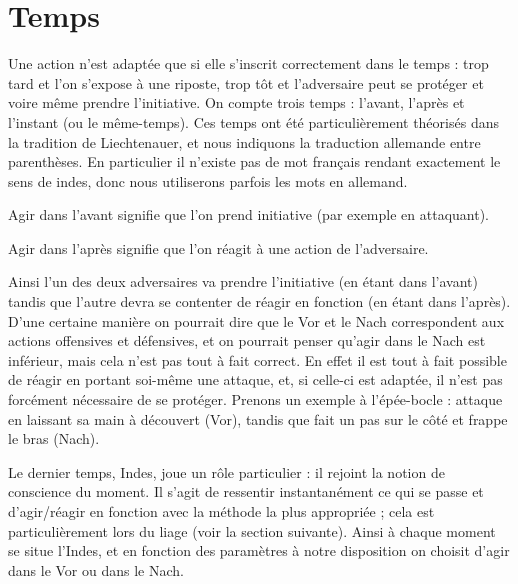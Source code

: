 \section{Temps}



Une action n'est adaptée que si elle s'inscrit correctement dans le temps : trop tard et l'on s'expose à une riposte, trop tôt et l'adversaire peut se protéger et voire même prendre l'initiative.
On compte trois temps : l'avant, l'après et l'instant (ou le même-temps).
Ces temps ont été particulièrement théorisés dans la tradition de Liechtenauer, et nous indiquons la traduction allemande entre parenthèses.
En particulier il n'existe pas de mot français rendant exactement le sens de indes, donc nous utiliserons parfois les mots en allemand.


\begin{definition}

	Agir dans l'avant signifie que l'on prend initiative (par exemple en attaquant).
\end{definition}


\begin{definition}

	Agir dans l'après signifie que l'on réagit à une action de l'adversaire.
\end{definition}


Ainsi l'un des deux adversaires va prendre l'initiative (en étant dans l'avant) tandis que l'autre devra se contenter de réagir en fonction (en étant dans l'après).
D'une certaine manière on pourrait dire que le Vor et le Nach correspondent aux actions offensives et défensives, et on pourrait penser qu'agir dans le Nach est inférieur, mais cela n'est pas tout à fait correct.
En effet il est tout à fait possible de réagir en portant soi-même une attaque, et, si celle-ci est adaptée, il n'est pas forcément nécessaire de se protéger.
Prenons un exemple à l'épée-bocle : \A attaque en laissant sa main à découvert (Vor), tandis que \D fait un pas sur le côté et frappe le bras (Nach).


Le dernier temps, Indes, joue un rôle particulier : il rejoint la notion de conscience du moment.
Il s'agit de ressentir instantanément ce qui se passe et d'agir/réagir en fonction avec la méthode la plus appropriée ; cela est particulièrement lors du liage (voir la section suivante).
Ainsi à chaque moment se situe l'Indes, et en fonction des paramètres à notre disposition on choisit d'agir dans le Vor ou dans le Nach.

